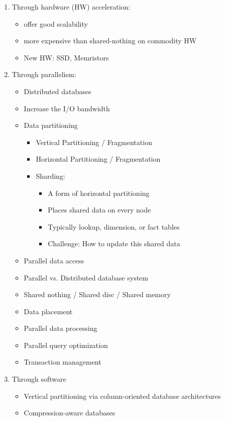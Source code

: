 \begin{breakbox}
\begin{enumerate}
	\item Through hardware (HW) acceleration:
		\begin{itemize}
			\item offer good scalability
			\item more expensive than shared-nothing on commodity HW
			\item New HW: SSD, Memristors
		\end{itemize}
	\item Through parallelism:
		\begin{itemize}
			\item Distributed databases
			\item Increase the I/O bandwidth
			\item Data partitioning
				\begin{itemize}
					\item Vertical Partitioning / Fragmentation
					\item Horizontal Partitioning / Fragmentation
					\item Sharding:
						\begin{itemize}
							\item A form of horizontal partitioning
							\item Places shared data on every node
							\item Typically lookup, dimension, or fact tables
							\item Challenge: How to update this shared data
						\end{itemize}
				\end{itemize}
			\item Parallel data access
			\item Parallel vs. Distributed database system
			\item Shared nothing / Shared disc / Shared memory
			\item Data placement
			\item Parallel data processing
			\item Parallel query optimization
			\item Transaction management
		\end{itemize}
	\item Through software
		\begin{itemize}
			\item Vertical partitioning via column-oriented database architectures
			\item Compression-aware databases
		\end{itemize}
\end{enumerate}
\end{breakbox}
